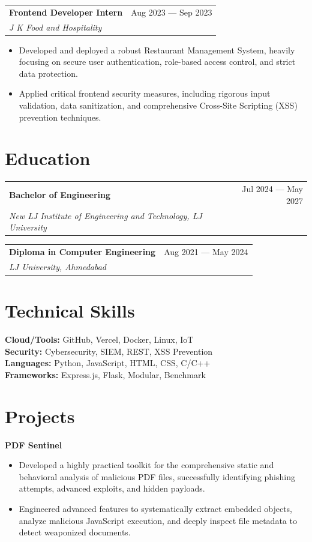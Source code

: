 \documentclass[a4paper,11pt]{article}
\makeatletter
\newcommand{\resumeEntry}[4]{
  \noindent
  \begin{tabularx}{\textwidth}{@{}X r@{}}
    \textbf{#1} & \textcolor{subtext}{\small #2} \\
    \textit{\textcolor{subtext}{#3}} & \\
  \end{tabularx}
  \begin{itemize}[leftmargin=16pt, itemsep=2pt, topsep=2pt, parsep=0pt, label={\textcolor{accent}{\small\textbullet}}]
    #4
  \end{itemize}
  \vspace{4pt}
}
\newcommand{\educationEntry}[3]{
  \noindent
  \begin{tabularx}{\textwidth}{@{}X r@{}}
    \textbf{#1} & \textcolor{subtext}{\small #2} \\
    \textit{\textcolor{subtext}{#3}} & \\
  \end{tabularx}
  \vspace{4pt}
}
\newcommand{\skillGroup}[2]{
  \noindent\textbf{#1:} {\small #2} \\[4pt]
}
\makeatother
\begin{document}
\resumeEntry
  {Frontend Developer Intern}
  {Aug 2023 — Sep 2023}
  {J K Food and Hospitality}
  {
    \item Developed and deployed a robust Restaurant Management System, heavily focusing on secure user authentication, role-based access control, and strict data protection.
    \item Applied critical frontend security measures, including rigorous input validation, data sanitization, and comprehensive Cross-Site Scripting (XSS) prevention techniques.
  }

\section{Education}

\educationEntry
  {Bachelor of Engineering}
  {Jul 2024 — May 2027}
  {New LJ Institute of Engineering and Technology, LJ University}

\educationEntry
  {Diploma in Computer Engineering}
  {Aug 2021 — May 2024}
  {LJ University, Ahmedabad}

\section{Technical Skills}

\skillGroup{Cloud/Tools}{GitHub, Vercel, Docker, Linux, IoT}
\skillGroup{Security}{Cybersecurity, SIEM, REST, XSS Prevention}
\skillGroup{Languages}{Python, JavaScript, HTML, CSS, C/C++}
\skillGroup{Frameworks}{Express.js, Flask, Modular, Benchmark}

\section{Projects}

\noindent\textbf{PDF Sentinel} \\
\begin{itemize}[leftmargin=16pt, itemsep=1pt, topsep=2pt, parsep=0pt, label={\textcolor{accent}{\small\textbullet}}]
  \item Developed a highly practical toolkit for the comprehensive static and behavioral analysis of malicious PDF files, successfully identifying phishing attempts, advanced exploits, and hidden payloads.
  \item Engineered advanced features to systematically extract embedded objects, analyze malicious JavaScript execution, and deeply inspect file metadata to detect weaponized documents.
\end{itemize}
\vspace{6pt}
\end{document}
